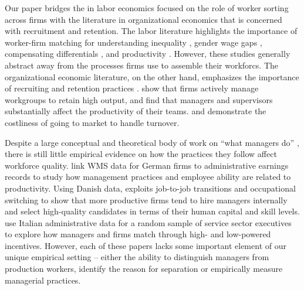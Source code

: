 Our paper bridges the in labor economics focused on the role of worker sorting across firms with the literature in organizational economics that is concerned with recruitment and retention. The labor literature highlights the importance of worker-firm matching for understanding inequality \citep{Card2013,Alvarez:Firms:AEJM:2018,Song:Firming:QJE:2018}, gender wage gaps \citep{Card:Bargaining:QJE:2016}, compensating differentials \citep{Lavetti:CDEM:WP:2018,Sorkin:Ranking:QJE:2018}, and productivity \citep{Iranzo2008}. However, these studies generally abstract away from the processes firms use to assemble their workforcs. The organizational economic literature, on the other hand, emphasizes the importance of recruiting and retention practices \citep{OyerSchaefer:HLE:2011,Hoffman:Discretion:QJE:2018}.  \citet{Hensvik2018} show that firms actively manage workgroups to retain high output, and \citet{shaw_bosses} find that managers and supervisors substantially affect the productivity of their teams. \citet{Jager2016} and \citet{Gallen2018} demonstrate the costliness of going to market to handle turnover.


Despite a large conceptual and theoretical body of work on ``what managers do'' \citep{gibbonshenderson_2012}, there is still little empirical evidence on how the practices they follow affect workforce quality. \citet{Bender:Management:JOLE:2018} link WMS data for German firms to administrative earnings records to study how management practices and employee ability are related to productivity.   Using Danish data, \citep{Friedrich2017}  exploits job-to-job transitions and occupational switching to show that more productive firms tend to hire managers internally and select high-quality candidates in terms of their human capital and skill levels. \citet{Bandiera:Matching:JOLE:2015} use Italian administrative data for a random sample of service sector executives to explore how managers and firms match through high- and low-powered incentives.  However, each of these papers lacks some important element of our unique empirical setting -- either the ability to distinguish managers from production workers, identify the reason for separation or empirically measure managerial practices.

